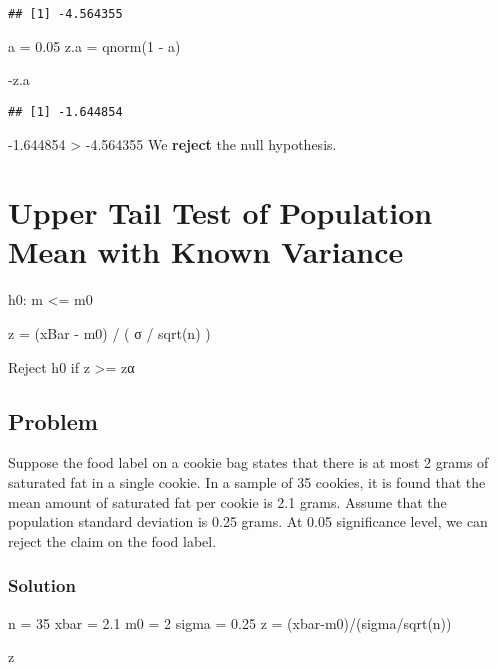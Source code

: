 \documentclass[
]{article}
\newenvironment{Shaded}{\begin{snugshade}}{\end{snugshade}}
\newcommand{\DecValTok}[1]{\textcolor[rgb]{0.00,0.00,0.81}{#1}}
\newcommand{\FloatTok}[1]{\textcolor[rgb]{0.00,0.00,0.81}{#1}}
\newcommand{\FunctionTok}[1]{\textcolor[rgb]{0.00,0.00,0.00}{#1}}
\newcommand{\NormalTok}[1]{#1}
\newcommand{\OtherTok}[1]{\textcolor[rgb]{0.56,0.35,0.01}{#1}}
\newcommand{\SpecialCharTok}[1]{\textcolor[rgb]{0.00,0.00,0.00}{#1}}
\begin{document}
\begin{verbatim}
## [1] -4.564355
\end{verbatim}

\begin{Shaded}
\begin{Highlighting}[]
\NormalTok{a }\OtherTok{=} \FloatTok{0.05} 
\NormalTok{z.a }\OtherTok{=} \FunctionTok{qnorm}\NormalTok{(}\DecValTok{1} \SpecialCharTok{{-}}\NormalTok{ a)}

\SpecialCharTok{{-}}\NormalTok{z.a}
\end{Highlighting}
\end{Shaded}

\begin{verbatim}
## [1] -1.644854
\end{verbatim}

-1.644854 \textgreater{} -4.564355 We \textbf{reject} the null
hypothesis.

\hypertarget{upper-tail-test-of-population-mean-with-known-variance}{%
\section{Upper Tail Test of Population Mean with Known
Variance}\label{upper-tail-test-of-population-mean-with-known-variance}}

h0: m \textless= m0

z = (xBar - m0) / ( σ / sqrt(n) )

Reject h0 if z \textgreater= zα

\hypertarget{problem-11}{%
\subsection{Problem}\label{problem-11}}

Suppose the food label on a cookie bag states that there is at most 2
grams of saturated fat in a single cookie. In a sample of 35 cookies, it
is found that the mean amount of saturated fat per cookie is 2.1 grams.
Assume that the population standard deviation is 0.25 grams. At 0.05
significance level, we can reject the claim on the food label.

\hypertarget{solution-13}{%
\subsubsection{Solution}\label{solution-13}}

\begin{Shaded}
\begin{Highlighting}[]
\NormalTok{n }\OtherTok{=} \DecValTok{35}
\NormalTok{xbar }\OtherTok{=} \FloatTok{2.1}
\NormalTok{m0 }\OtherTok{=} \DecValTok{2}
\NormalTok{sigma }\OtherTok{=} \FloatTok{0.25}
\NormalTok{z }\OtherTok{=}\NormalTok{ (xbar}\SpecialCharTok{{-}}\NormalTok{m0)}\SpecialCharTok{/}\NormalTok{(sigma}\SpecialCharTok{/}\FunctionTok{sqrt}\NormalTok{(n))}

\NormalTok{z}
\end{Highlighting}
\end{Shaded}
\end{document}
